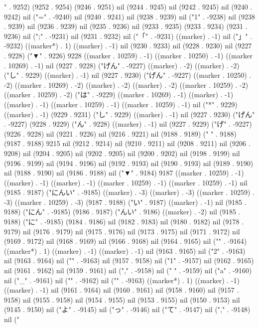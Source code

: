 {{" . 9252) (9252 . 9254) (9246 . 9251) nil (9244 . 9245) nil (9242 . 9245) nil (9240 . 9242) nil ("=" . -9240) nil (9240 . 9241) nil (9238 . 9239) nil ("1" . -9238) nil (9238 . 9239) nil (9236 . 9239) nil (9235 . 9236) nil (9233 . 9235) (9233 . 9234) (9231 . 9236) nil (";" . -9231) nil (9231 . 9232) nil ("「" . -9231) ((marker) . -1) nil ("」" . -9232) ((marker*) . 1) ((marker) . -1) nil (9230 . 9233) nil (9228 . 9230) nil (9227 . 9228) ("▼" . 9226) 9228 ((marker . 10259) . -1) ((marker . 10250) . -1) ((marker . 10269) . -1) nil (9227 . 9228) ("げん" . -9227) ((marker) . -2) ((marker) . -2) ("し" . 9229) ((marker) . -1) nil (9227 . 9230) ("げん" . -9227) ((marker . 10250) . -2) ((marker . 10269) . -2) ((marker) . -2) ((marker) . -2) ((marker . 10259) . -2) ((marker . 10259) . -2) ("は" . -9229) ((marker . 10269) . -1) ((marker) . -1) ((marker) . -1) ((marker . 10259) . -1) ((marker . 10259) . -1) nil ("*" . 9229) ((marker) . -1) (9229 . 9231) ("し" . 9229) ((marker) . -1) nil (9227 . 9230) ("げん" . -9227) (9228 . 9229) ("ん" . 9228) ((marker) . -1) nil (9227 . 9229) ("げ" . -9227) (9226 . 9228) nil (9221 . 9226) nil (9216 . 9221) nil (9188 . 9189) (" " . 9188) (9187 . 9188) 9215 nil (9212 . 9214) nil (9210 . 9211) nil (9208 . 9211) nil (9206 . 9208) nil (9204 . 9205) nil (9202 . 9205) nil (9200 . 9202) nil (9198 . 9199) nil (9196 . 9199) nil (9194 . 9196) nil (9192 . 9193) nil (9190 . 9193) nil (9189 . 9190) nil (9188 . 9190) nil (9186 . 9188) nil ("▼" . 9184) 9187 ((marker . 10259) . -1) ((marker) . -1) ((marker) . -1) ((marker . 10259) . -1) ((marker . 10259) . -1) nil (9185 . 9187) ("にんい" . -9185) ((marker) . -3) ((marker) . -3) ((marker . 10259) . -3) ((marker . 10259) . -3) (9187 . 9188) ("い" . 9187) ((marker) . -1) nil (9185 . 9188) ("にん" . -9185) (9186 . 9187) ("んい" . 9186) ((marker) . -2) nil (9185 . 9188) ("に" . -9185) (9184 . 9186) nil (9182 . 9183) nil (9180 . 9182) nil (9178 . 9179) nil (9176 . 9179) nil (9175 . 9176) nil (9173 . 9175) nil (9171 . 9172) nil (9169 . 9172) nil (9168 . 9169) nil (9166 . 9168) nil (9164 . 9165) nil ("}" . -9164) ((marker*) . 1) ((marker) . -1) ((marker) . -1) nil (9163 . 9165) nil ("2" . -9163) nil (9163 . 9164) nil ("{" . -9163) nil (9157 . 9158) nil ("1" . -9157) nil (9162 . 9165) nil (9161 . 9162) nil (9159 . 9161) nil ("," . -9158) nil (" " . -9159) nil ("a" . -9160) nil ("_" . -9161) nil ("{" . -9162) nil ("}" . -9163) ((marker*) . 1) ((marker) . -1) ((marker) . -1) nil (9161 . 9164) nil (9160 . 9161) nil (9158 . 9160) nil (9157 . 9158) nil (9155 . 9158) nil (9154 . 9155) nil (9153 . 9155) nil (9150 . 9153) nil (9145 . 9150) nil ("よ" . -9145) nil ("っ" . -9146) nil ("て" . -9147) nil ("," . -9148) nil ("
}}
